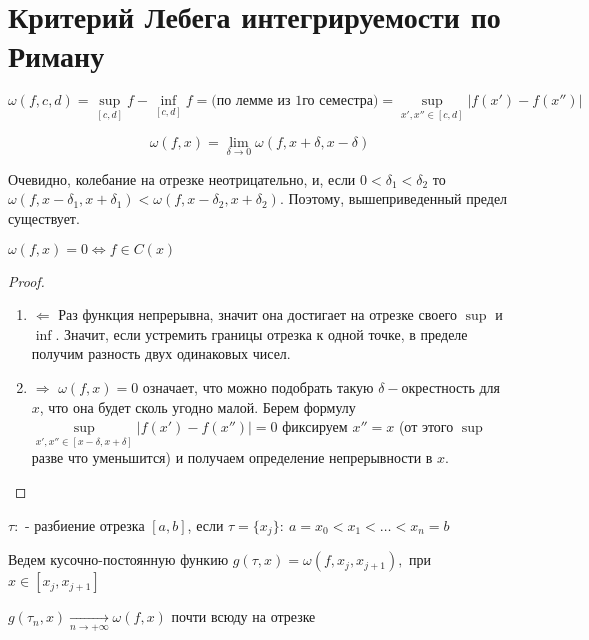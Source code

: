 \section{Критерий Лебега интегрируемости по Риману}

\begin{definition}
	\[ \omega(f, c, d) = \sup\limits_{[c, d]} f - \inf\limits_{[c, d]} f =  \text{(по лемме из 1го семестра)}  = \sup\limits_{x',x'' \in [c,d]} | f(x') - f(x'') |\]
\end{definition}

\begin{definition}
	\[ \omega(f, x) = \lim\limits_{\delta \rightarrow 0} \omega(f, x + \delta, x - \delta)\]
\end{definition}

Очевидно, колебание на отрезке неотрицательно, и, если $0 < \delta_1 < \delta_2$ то $\omega(f, x - \delta_1, x + \delta_1) < \omega(f, x - \delta_2, x + \delta_2)$.
Поэтому, вышеприведенный предел существует.

\begin{statement}
$\omega(f, x) = 0 \Leftrightarrow f \in C(x)$
\end{statement}

\begin{proof}
	\begin{enumerate}
		\item $\Leftarrow$ Раз функция непрерывна, значит она достигает на отрезке своего $\sup$ и $\inf$. Значит, если устремить границы отрезка к одной точке, в пределе получим разность двух одинаковых чисел.
		\item $\Rightarrow$ $\omega(f, x) = 0$ означает, что можно подобрать такую $\delta-$окрестность для $x$, что она будет сколь угодно малой. Берем формулу $\sup\limits_{x',x'' \in [x - \delta,x + \delta]} | f(x') - f(x'') | = 0$ фиксируем $x'' = x$ (от этого $\sup$ разве что уменьшится) и получаем определение непрерывности в $x$.
	\end{enumerate}
\end{proof}

\begin{definition}
$\tau:$ - разбиение отрезка $[a, b]$, если $\tau = \{x_j\}: \: a = x_0 < x_1 < \dots < x_n = b$
\end{definition}

Ведем кусочно-постоянную функию $g(\tau, x) = \omega(f, x_j, x_{j + 1}),$ при $x \in [x_j, x_{j + 1}]$

\begin{statement}
$g(\tau_n, x) \xrightarrow[n \rightarrow +\infty]{} \omega(f, x)$ почти всюду на отрезке
\end{statement}

